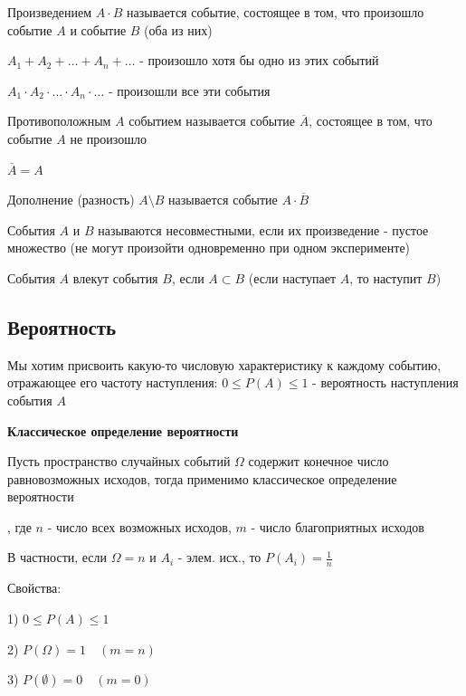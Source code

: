 \documentclass[12pt]{article}
\begin{document}
     Произведением $A \cdot B$ называется событие, состоящее в том, что произошло событие $A$ и событие $B$ (оба из них)

    \Notas $A_1 + A_2 + \dots + A_n + \dots$ - произошло хотя бы одно из этих событий

    $A_1 \cdot A_2 \cdot \dots \cdot A_n \cdot \dots$ - произошли все эти события

     Противоположным $A$ событием называется событие $\overline{A}$, состоящее в том, что событие $A$ не произошло

    \Notas $\overline{A} = A$ %

     Дополнение (разность) $A \setminus B$ называется событие $A \cdot \overline{B}$

     События $A$ и $B$ называются несовместными, если их произведение - пустое множество
    (не могут произойти одновременно при одном эксперименте)

     События $A$ влекут события $B$, если $A \subset B$ (если наступает $A$, то наступит $B$)

    \subsection{Вероятность}

    Мы хотим присвоить какую-то числовую характеристику к каждому событию,
    отражающее его частоту наступления: $0 \leq P(A) \leq 1$ - вероятность наступления события $A$

    \mediumvspace

    \hypertarget{classicdefinitionofprobability}{}

    \textbf{Классическое определение вероятности}

    Пусть пространство случайных событий $\Omega$ содержит конечное число равновозможных исходов,
    тогда применимо классическое определение вероятности

    \Def {}, где $n$ - число всех возможных исходов, $m$ - число благоприятных исходов

    В частности, если $\Omega = n$ и $A_i$ - элем. исх., то $P(A_i) = \frac{1}{n}$

    Свойства:

    1) $0 \leq P(A) \leq 1$

    2) $P(\Omega) = 1 \quad (m = n)$

    3) $P(\emptyset) = 0 \quad (m = 0)$
\end{document}

